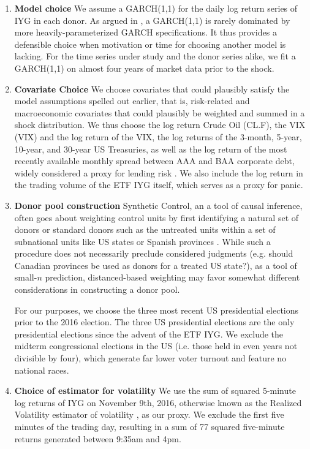 \documentclass[11pt]{article}
\theoremstyle{definition}
\begin{document}
\begin{enumerate}
    \item \textbf{Model choice} We assume a GARCH(1,1) for the daily log return series of IYG in each donor.  As argued in \citet{hansen2005forecast}, a GARCH(1,1) is rarely dominated by more heavily-parameterized GARCH specifications.  It thus provides a defensible choice when motivation or time for choosing another model is lacking.  For the time series under study and the donor series alike, we fit a GARCH(1,1) on almost four years of market data prior to the shock.

    \item \textbf{Covariate Choice} We choose covariates that could plausibly satisfy the model assumptions spelled out earlier, that is, risk-related and macroeconomic covariates that could plausibly be weighted and summed in a shock distribution.  We thus choose the log return Crude Oil (CL.F), the VIX (VIX) and the log return of the VIX, the log returns of the 3-month, 5-year, 10-year, and 30-year US Treasuries, as well as the log return of the most recently available monthly spread between AAA and BAA corporate debt, widely considered a proxy for lending risk \citep{goodell2013us, kane1996p}.  We also include the log return in the trading volume of the ETF IYG itself, which serves as a proxy for panic.

    \item \textbf{Donor pool construction} Synthetic Control, an a tool of causal inference, often goes about weighting control units by first identifying a natural set of donors or standard donors such as the untreated units within a set of subnational units like US states or Spanish provinces \citep{abadie2003economic, abadie2010synthetic}.  While such a procedure does not necessarily preclude considered judgments (e.g. should Canadian provinces be used as donors for a treated US state?), as a tool of small-$n$ prediction, distanced-based weighting may favor somewhat different considerations in constructing a donor pool. 
    
    For our purposes, we choose the three most recent US presidential elections prior to the 2016 election.  The three US presidential elections are the only presidential elections since the advent of the ETF IYG.  We exclude the midterm congressional elections in the US (i.e. those held in even years not divisible by four), which generate far lower voter turnout and feature no national races.

    \item \textbf{Choice of estimator for volatility} We use the sum of squared 5-minute log returns of IYG on November 9th, 2016, otherwise known as the Realized Volatility estimator of volatility \citep{andersen2009realized}, as our proxy.  We exclude the first five minutes of the trading day, resulting in a sum of 77 squared five-minute returns generated between 9:35am and 4pm.
\end{enumerate} 
\end{document}
